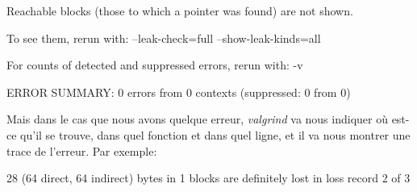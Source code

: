 \documentclass[a4paper,12pt]{article}
\begin{document}
\noindent \begin{justify}
\hspace*{0.49in}\hspace*{0.49in}Reachable blocks (those to which a pointer was found) are not shown.
\end{justify}\par


\noindent \begin{justify}
\hspace*{0.49in}\hspace*{0.49in}To see them, rerun with: --leak-check=full --show-leak-kinds=all
\end{justify}\par


\noindent \begin{justify}
 
\end{justify}\par

\noindent \begin{justify}
\hspace*{0.49in}\hspace*{0.49in}For counts of detected and suppressed errors, rerun with: -v
\end{justify}\par


\noindent \begin{justify}
\hspace*{0.49in}\hspace*{0.49in}ERROR SUMMARY: 0 errors from 0 contexts (suppressed: 0 from 0)
\end{justify}\par


\vspace{\baselineskip}

\noindent \begin{justify}
Mais dans le cas que nous avons quelque erreur, \textit{valgrind }va nous indiquer où est-ce qu’il se trouve, dans quel fonction et dans quel ligne, et il va nous montrer une trace de l’erreur. Par exemple:
\end{justify}\par


\noindent \begin{justify}
\hspace*{0.49in}\hspace*{0.49in}28 (64 direct, 64 indirect) bytes in 1 blocks are definitely lost in loss record 2 of 3
\end{justify}\par
\end{document}
